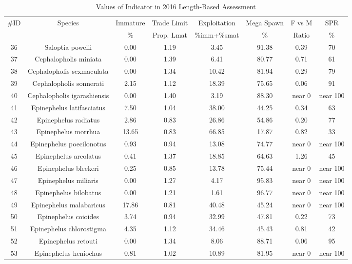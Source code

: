 \documentclass{report}\usepackage[]{graphicx}\usepackage[]{color}
\begin{document}
\begin{table}[ht]
\centering
\caption{Values of Indicator in 2016 Length-Based Assessment} 
{\small
\begin{tabular}{cccccccc}
  \hline
\#ID & Species & Immature & Trade Limit & Exploitation & Mega Spawn & F vs M & SPR \\ 
  {} & {} & {\%} & {Prop. Lmat} & {\%imm+\%smat} & {\%} & {Ratio} & {\%} \\ \hline
 36 & Saloptia powelli & 0.00 & 1.19 & 3.45 & 91.38 & 0.39 & 70 \\ 
   37 & Cephalopholis miniata & 0.00 & 1.39 & 6.41 & 80.77 & 0.71 & 61 \\ 
   38 & Cephalopholis sexmaculata & 0.00 & 1.34 & 10.42 & 81.94 & 0.29 & 79 \\ 
   39 & Cephalopholis sonnerati & 2.15 & 1.12 & 18.39 & 75.65 & 0.06 & 91 \\ 
   40 & Cephalopholis igarashiensis & 0.00 & 1.40 & 3.19 & 88.30 & near 0 & near 100 \\ 
   41 & Epinephelus latifasciatus & 7.50 & 1.04 & 38.00 & 44.25 & 0.34 & 63 \\ 
   42 & Epinephelus radiatus & 2.86 & 0.83 & 26.86 & 54.86 & 0.20 & 77 \\ 
   43 & Epinephelus morrhua & 13.65 & 0.83 & 66.85 & 17.87 & 0.82 & 33 \\ 
   44 & Epinephelus poecilonotus & 0.93 & 0.94 & 13.08 & 74.77 & near 0 & near 100 \\ 
   45 & Epinephelus areolatus & 0.41 & 1.37 & 18.85 & 64.63 & 1.26 & 45 \\ 
   46 & Epinephelus bleekeri & 0.25 & 0.85 & 13.78 & 75.44 & near 0 & near 100 \\ 
   47 & Epinephelus miliaris & 0.00 & 1.27 & 4.17 & 95.83 & near 0 & near 100 \\ 
   48 & Epinephelus bilobatus & 0.00 & 1.21 & 1.61 & 96.77 & near 0 & near 100 \\ 
   49 & Epinephelus malabaricus & 17.86 & 0.81 & 40.48 & 45.24 & near 0 & near 100 \\ 
   50 & Epinephelus coioides & 3.74 & 0.94 & 32.99 & 47.81 & 0.22 & 73 \\ 
   51 & Epinephelus chlorostigma & 4.35 & 1.12 & 34.46 & 45.43 & 0.81 & 42 \\ 
   52 & Epinephelus retouti & 0.00 & 1.34 & 8.06 & 88.71 & 0.06 & 95 \\ 
   53 & Epinephelus heniochus & 0.81 & 1.02 & 10.89 & 81.95 & near 0 & near 100 \\ 

\end{tabular}}
\end{table}
\end{document}
